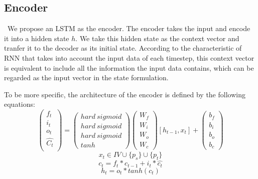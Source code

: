 \documentclass[runningheads]{llncs}
\begin{document}
\subsection{Encoder}
\quad\, We propose an LSTM as the encoder. The encoder takes the input and encode it into a hidden state $h$. We take this hidden state as the context vector and tranfer it to the decoder as its initial state. According to the characteristic of RNN that takes into account the input data of each timestep, this context vector is equivalent to include all the information the input data contains, which can be regarded as the input vector in the state formulation. 

To be more specific, the architecture of the encoder is defined by the following equations:
\begin{equation}
    \label{eqn3}
	\left(
	    \begin{array}{ccc}
	        f_t\\
	        i_t\\
	        o_t\\
	        \hat{C_t}\\
	    \end{array}
	\right)
	=
	\left(
	    \begin{array}{ccc}
	    hard\: sigmoid\\
	    hard\: sigmoid\\
	    hard\: sigmoid\\
	    tanh
	    \end{array}
	\right)
	\left(
	    \begin{array}{ccc}
        W_f\\
	    W_i\\
	    W_o\\
	    W_c
	    \end{array}
	\right)
	\left[h_{t-1},x_t\right]+
	\left(
	    \begin{array}{ccc}
            b_f\\
            b_i\\
            b_o\\
            b_c
	    \end{array}
	\right)
\end{equation} 
\begin{equation}
    \label{eqn5}
	x_t \in IV\cup\{p_s\}\cup\{p_t\}
\end{equation}
\begin{equation}
    \label{eqn6}
	c_t = f_t*c_{t-1}+i_t*\hat{c_t}
\end{equation}
\begin{equation}
    \label{eqn7}
	h_t=o_t*tanh(c_t)
\end{equation}
\end{document}
